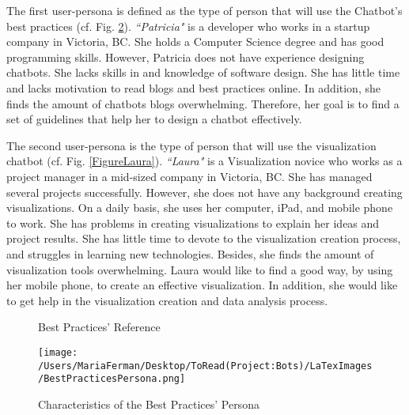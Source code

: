 \documentclass[a4paper,10pt]{article}
\begin{document}
The first user-persona is defined as the type of person that will use the Chatbot's best practices (cf. Fig. \ref{FigurePatricia}). \textit{``Patricia"} is a developer who works in a startup company in Victoria, BC. She holds a Computer Science degree and has good programming skills. However, Patricia does not have experience designing chatbots. She lacks skills in and knowledge of software design. She has little time and lacks motivation to read blogs and best practices online. In addition, she finds the amount of chatbots blogs overwhelming. Therefore, her goal is to find a set of guidelines that help her to design a chatbot effectively. 

The second user-persona is the type of person that will use the visualization chatbot (cf. Fig. \ref{FigureLaura}). \textit{``Laura"} is a Visualization novice who works as a project manager in a mid-sized company in Victoria, BC. She has managed several projects successfully. However, she does not have any background creating visualizations. On a daily basis, she uses her computer, iPad, and mobile phone to work. She has problems in creating visualizations to explain her ideas and project results. She has little time to devote to the visualization creation process, and struggles in learning new technologies. Besides, she finds the amount of visualization tools overwhelming. Laura would like to find a good way, by using her mobile phone, to create an effective visualization. In addition, she would like to get help in the visualization creation and data analysis process.  


\begin{landscape}
\begin{figure}[p]
\thispagestyle{empty}
\vfill
    \caption{Best Practices' Reference}
\begin{center}    
    {\thepage}
\end{center}
    \label{FigureReferencetable}
\end{figure}
\end{landscape}

\begin{figure}
\centering
\texttt{[image: /Users/MariaFerman/Desktop/ToRead(Project:Bots)/LaTexImages/BestPracticesPersona.png]}
\caption{Characteristics of the Best Practices' Persona}
\label{FigurePatricia}
\end{figure}
\end{document}
